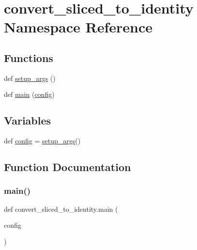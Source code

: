 \hypertarget{namespaceconvert__sliced__to__identity}{}\section{convert\+\_\+sliced\+\_\+to\+\_\+identity Namespace Reference}
\label{namespaceconvert__sliced__to__identity}
\subsection*{Functions}
\begin{DoxyCompactItemize}
\item 
def \hyperlink{namespaceconvert__sliced__to__identity_a9f82ac7f79fa007df39d00659e714fe9}{setup\+\_\+args} ()
\item 
def \hyperlink{namespaceconvert__sliced__to__identity_ace07c7ec4abee6320d35f7aea3c9a293}{main} (\hyperlink{namespaceconvert__sliced__to__identity_a4887a8673b51a69b946a08f73c88b713}{config})
\end{DoxyCompactItemize}
\subsection*{Variables}
\begin{DoxyCompactItemize}
\item 
def \hyperlink{namespaceconvert__sliced__to__identity_a4887a8673b51a69b946a08f73c88b713}{config} = \hyperlink{namespaceconvert__sliced__to__identity_a9f82ac7f79fa007df39d00659e714fe9}{setup\+\_\+args}()
\end{DoxyCompactItemize}


\subsection{Function Documentation}
\mbox{\label{namespaceconvert__sliced__to__identity_ace07c7ec4abee6320d35f7aea3c9a293}} 
\subsubsection{\texorpdfstring{main()}{main()}}
{\footnotesize\ttfamily def convert\+\_\+sliced\+\_\+to\+\_\+identity.\+main (\begin{DoxyParamCaption}\item[{}]{config }\end{DoxyParamCaption})}


